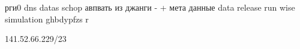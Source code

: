 рги0 dns
datas schop авпвать из джанги -
+ мета данные
data release
run wise simulation ghbdypfzs r

141.52.66.229/23
